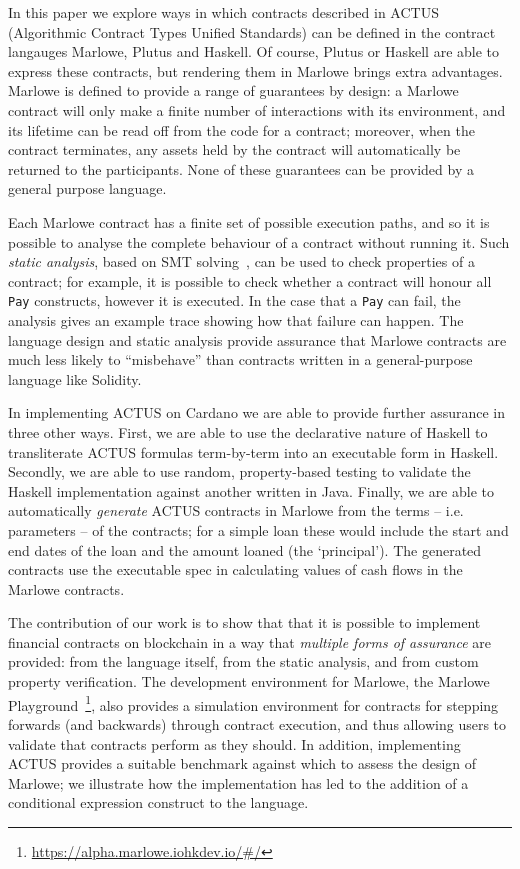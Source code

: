 \documentclass[runningheads]{llncs}
\begin{document}
In this paper we explore ways in which contracts described in ACTUS (Algorithmic Contract Types Unified Standards) can be defined in the contract langauges Marlowe, Plutus and Haskell. Of course, Plutus or Haskell are able to express these contracts, but rendering them in Marlowe brings extra advantages. Marlowe is defined to provide a range of guarantees by design: a Marlowe contract will only make a finite number of interactions with its environment, and its lifetime can be read off from the code for a contract; moreover, when the contract terminates, any assets held by the contract will automatically be returned to the participants. None of these guarantees can be provided by a general purpose language. 

Each Marlowe contract has a finite set of possible execution paths, and so it is possible to analyse the complete behaviour of a contract without running it. Such \emph{static analysis}, based on SMT solving~\cite{smt}, can be used to check properties of a contract; for example, it is possible to check whether a contract will honour all \texttt{Pay} constructs, however it is executed. In the case that a \texttt{Pay} can fail, the analysis gives an example trace showing how that failure can happen.
The language design and static analysis provide assurance that Marlowe contracts are much less likely to ``misbehave'' than contracts written in a general-purpose language like Solidity. 

In implementing ACTUS on Cardano we are able to provide further assurance in three other ways. First, we are able to use the declarative nature of Haskell to transliterate ACTUS formulas term-by-term into an executable form in Haskell. Secondly, we are able to use random, property-based testing to validate the Haskell implementation against another written in Java. Finally, we are able to automatically \emph{generate} ACTUS contracts in Marlowe from the terms -- i.e. parameters -- of the contracts; for a simple loan these would include the start and end dates of the loan and the amount loaned (the `principal'). The generated contracts use the executable spec in calculating values of cash flows in the Marlowe contracts.

The contribution of our work is to show that that it is possible to implement financial contracts on blockchain in a way that \emph{multiple forms of assurance} are provided: from the language itself, from the static analysis, and from custom property verification. The development environment for Marlowe, the Marlowe Playground~\footnote{\url{https://alpha.marlowe.iohkdev.io/\#/}}, also provides a simulation environment for contracts for stepping forwards (and backwards) through contract execution, and thus allowing users to validate that contracts perform as they should. In addition, implementing ACTUS provides a suitable benchmark against which to assess the design of Marlowe; we illustrate how the implementation has led to the addition of a conditional expression construct to the language. 
\end{document}
